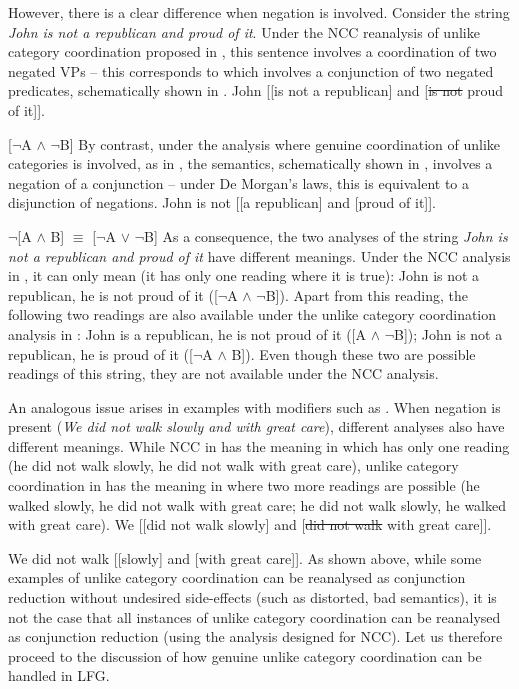 \documentclass[output=paper]{../langscibook}
\begin{document}
However, there is a clear difference when negation is involved.
Consider the string \emph{John is not a republican and proud of
  it}. Under the NCC reanalysis of unlike category coordination
proposed in \citet{max:man:96}, this sentence involves a
coordination of two negated VPs – this corresponds to
 which involves a conjunction of two
negated predicates, schematically shown in
.
\ea\label{ex:max:man:96:14:NEG:bicl} John [[is not a republican] and [\st{is not} proud of it]].
  \item\label{ex:max:man:96:14:NEG:bicl:sem} [$\neg$A $\land$ $\neg$B]
\z
By contrast, under the analysis where genuine coordination of unlike
categories is involved, as in , the
semantics, schematically shown in
, involves a negation of a
conjunction – under De Morgan's laws, this is equivalent to a
disjunction of negations.
\ea\label{ex:max:man:96:14:NEG:mono} John is not [[a republican] and [proud of it]].
  \item\label{ex:max:man:96:14:NEG:mono:sem} $\neg$[A $\land$ B] $\equiv$ [$\neg$A $\lor$ $\neg$B]
\z
As a consequence, the two analyses of the string \emph{John is not a
  republican and proud of it} have different
meanings. Under the NCC analysis in , it can only mean (it has only one reading
where it is true): John is not a republican, he is not proud of it
([$\neg$A $\land$ $\neg$B]). Apart from this reading, the following
two readings are also available under the unlike category coordination
analysis in : John is a
republican, he is not proud of it ([A $\land$ $\neg$B]); John is not a
republican, he is proud of it ([$\neg$A $\land$ B]). Even though these
two are possible readings of this string, they are not available under
the NCC analysis.

An analogous issue arises in examples with modifiers such as
. When negation is present (\emph{We did not
  walk slowly and with great care}), different analyses also have different
meanings. While NCC in  has the meaning
in  which has only one reading (he
did not walk slowly, he did not walk with great care), unlike category
coordination in  has the meaning in
 where two more readings are
possible (he walked slowly, he did not walk with great care; he did
not walk slowly, he walked with great care).
\ea\label{ex:sag:etal:85:57:NEG:CR} We [[did not walk slowly] and [\st{did not walk} with great care]].
  \item\label{ex:sag:etal:85:57:NEG:mono} We did not walk [[slowly] and [with great care]].
\z
As shown above, while some examples of unlike category coordination can be
reanalysed as conjunction reduction without undesired side-effects
(such as distorted, bad semantics), it is not the case that all instances of
unlike category coordination can be
reanalysed as conjunction reduction (using the analysis designed for NCC). Let us therefore proceed to the
discussion of how genuine unlike category coordination can be handled
in LFG.
\end{document}
